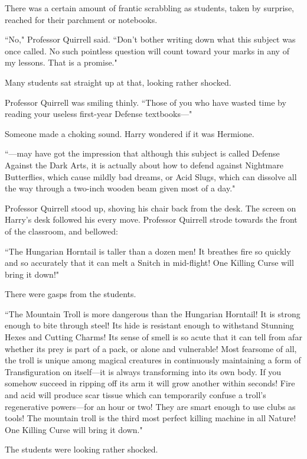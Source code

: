 There was a certain amount of frantic scrabbling as students, taken by surprise, reached for their parchment or notebooks.

``No," Professor Quirrell said. ``Don't bother writing down what this subject was once called. No such pointless question will count toward your marks in any of my lessons. That is a promise."

Many students sat straight up at that, looking rather shocked.

Professor Quirrell was smiling thinly. ``Those of you who have wasted time by reading your useless first-year Defense textbooks—"

Someone made a choking sound. Harry wondered if it was Hermione.

``—may have got the impression that although this subject is called Defense Against the Dark Arts, it is actually about how to defend against Nightmare Butterflies, which cause mildly bad dreams, or Acid Slugs, which can dissolve all the way through a two-inch wooden beam given most of a day."

Professor Quirrell stood up, shoving his chair back from the desk. The screen on Harry's desk followed his every move. Professor Quirrell strode towards the front of the classroom, and bellowed:

``The Hungarian Horntail is taller than a dozen men! It breathes fire so quickly and so accurately that it can melt a Snitch in mid-flight! One Killing Curse will bring it down!"

There were gasps from the students.

``The Mountain Troll is more dangerous than the Hungarian Horntail! It is strong enough to bite through steel! Its hide is resistant enough to withstand Stunning Hexes and Cutting Charms! Its sense of smell is so acute that it can tell from afar whether its prey is part of a pack, or alone and vulnerable! Most fearsome of all, the troll is unique among magical creatures in continuously maintaining a form of Transfiguration on itself—it is always transforming into its own body. If you somehow succeed in ripping off its arm it will grow another within seconds! Fire and acid will produce scar tissue which can temporarily confuse a troll's regenerative powers—for an hour or two! They are smart enough to use clubs as tools! The mountain troll is the third most perfect killing machine in all Nature! One Killing Curse will bring it down."

The students were looking rather shocked.

